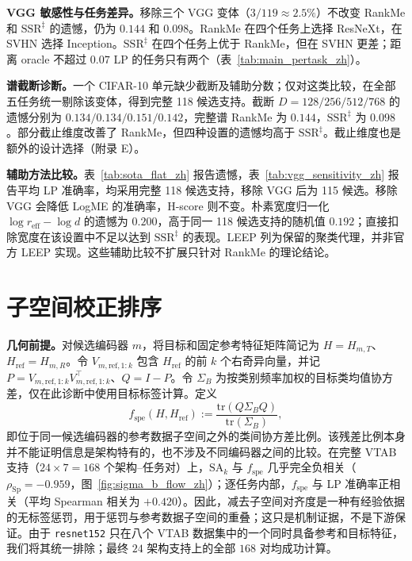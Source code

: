 \documentclass{article}
\newcommand{\reff}{\ensuremath{r_{\mathrm{eff}}}\xspace}
\newcommand{\SAk}{\ensuremath{\mathrm{SA}_k}\xspace}
\newcommand{\SSRdag}{\ensuremath{\mathrm{SSR}^{\ddagger}}\xspace}
\newcommand{\rhoSp}{\ensuremath{\rho_{\mathrm{Sp}}}\xspace}
\begin{document}
\textbf{VGG 敏感性与任务差异。}移除三个 VGG 变体（$3/119\approx2.5\%$）不改变 RankMe 和 \SSRdag 的遗憾，仍为 $0.144$ 和 $0.098$。RankMe 在四个任务上选择 ResNeXt，在 SVHN 选择 Inception。\SSRdag 在四个任务上优于 RankMe，但在 SVHN 更差；距离 oracle 不超过 $0.07$ LP 的任务只有两个（表~\ref{tab:main_pertask_zh}）。



\textbf{谱截断诊断。}一个 CIFAR-10 单元缺少截断及辅助分数；仅对这类比较，在全部五任务统一剔除该变体，得到完整 118 候选支持。截断 $D=128/256/512/768$ 的遗憾分别为 $0.134/0.134/0.151/0.142$，完整谱 RankMe 为 $0.144$，\SSRdag 为 $0.098$。部分截止维度改善了 RankMe，但四种设置的遗憾均高于 \SSRdag。截止维度也是额外的设计选择（附录 E）。

\textbf{辅助方法比较。}表~\ref{tab:sota_flat_zh} 报告遗憾，表~\ref{tab:vgg_sensitivity_zh} 报告平均 LP 准确率，均采用完整 118 候选支持，移除 VGG 后为 115 候选。移除 VGG 会降低 LogME 的准确率，H-score 则不变。朴素宽度归一化 $\log\reff-\log d$ 的遗憾为 $0.200$，高于同一 118 候选支持的随机值 $0.192$；直接扣除宽度在该设置中不足以达到 \SSRdag 的表现。LEEP 列为保留的聚类代理，并非官方 LEEP 实现。这些辅助比较不扩展只针对 RankMe 的理论结论。





\section{子空间校正排序}
\label{sec:ssr_zh}
\textbf{几何前提。}对候选编码器 $m$，将目标和固定参考特征矩阵简记为 $H=H_{m,T}$、$H_{\mathrm{ref}}=H_{m,R}$。令 $V_{m,\mathrm{ref},1:k}$ 包含 $H_{\mathrm{ref}}$ 的前 $k$ 个右奇异向量，并记 $P=V_{m,\mathrm{ref},1:k}V_{m,\mathrm{ref},1:k}^{\top}$、$Q=I-P$。令 $\Sigma_B$ 为按类别频率加权的目标类均值协方差，仅在此诊断中使用目标标签计算。定义
\[
f_{\mathrm{spe}}(H,H_{\mathrm{ref}}):=\frac{\mathrm{tr}(Q\Sigma_BQ)}{\mathrm{tr}(\Sigma_B)},
\]
即位于同一候选编码器的参考数据子空间之外的类间协方差比例。该残差比例本身并不能证明信息是架构特有的，也不涉及不同编码器之间的比较。在完整 VTAB 支持（$24\times7=168$ 个架构--任务对）上，$\SAk$ 与 $f_{\mathrm{spe}}$ 几乎完全负相关（$\rhoSp=-0.959$，图~\ref{fig:sigma_b_flow_zh}）；逐任务内部，$f_{\mathrm{spe}}$ 与 LP 准确率正相关（平均 Spearman 相关为 $+0.420$）。因此，减去子空间对齐度是一种有经验依据的无标签惩罚，用于惩罚与参考数据子空间的重叠；这只是机制证据，不是下游保证。由于 \texttt{resnet152} 只在八个 VTAB 数据集中的一个同时具备参考和目标特征，我们将其统一排除；最终 $24$ 架构支持上的全部 $168$ 对均成功计算。
\end{document}
